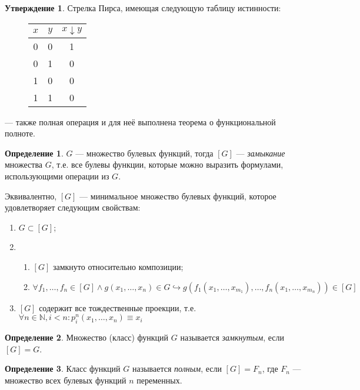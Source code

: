 \documentclass[12pt]{article}
\let\eq\equiv
\def\NN{\mathbb{N}}
\theoremstyle{definition}
\newtheorem{definition}{Определение}[section]
\theoremstyle{statement}
\newtheorem{statement}{Утверждение}[section]
\theoremstyle{theorem}
\begin{document}
\begin{statement}
  Стрелка Пирса, имеющая следующую таблицу истинности:
  \begin{figure}[H]
    \centering
    \begin{tabular}{c|c|c}
      $x$ & $y$ & $x \downarrow y$\\\hline
      0 & 0 & 1\\\hline
      0 & 1 & 0\\\hline
      1 & 0 & 0\\\hline
      1 & 1 & 0
    \end{tabular}
  \end{figure}
  --- также
  полная операция и для неё выполнена теорема о функциональной полноте.
\end{statement}
\begin{definition}
  $G$ --- множество булевых функций, тогда $[G]$ ---
  \textit{замыкание} множества $G$, т.е. все булевы функции, которые
  можно выразить формулами, использующими операции из $G$.

  Эквивалентно, $[G]$ --- минимальное множество булевых функций,
  которое удовлетворяет следующим свойствам:
  \begin{enumerate}
    \item $G \subset [G]$;

    \item
      \begin{enumerate}
        \item $[G]$ замкнуто относительно композиции;

        \item $\forall f_1, \ldots, f_n \in [G] \land g(x_1, \ldots, x_n)
          \in G \hookrightarrow g(f_1(x_1, \ldots, x_{m_1}), \ldots,
          f_n(x_1, \ldots, x_{m_n})) \in [G]$
      \end{enumerate}

    \item $[G]$ содержит все тождественные проекции, т.е. $\forall n
      \in \NN, i < n \colon p_i^n(x_1, \ldots, x_n) \eq x_i$
  \end{enumerate}
\end{definition}
\begin{definition}
  Множество (класс) функций $G$ называется \textit{замкнутым}, если $[G] = G$.
\end{definition}
\begin{definition}
  Класс функций $G$ называется \textit{полным}, если $[G] = F_n$, где
  $F_n$ --- множество всех булевых функций $n$ переменных.
\end{definition}
\end{document}
